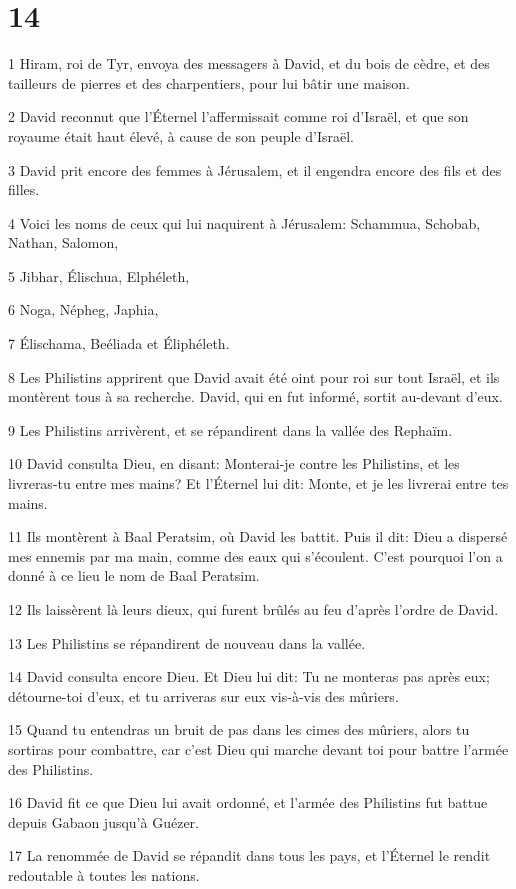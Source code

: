 \chapter{14}

\par 1 Hiram, roi de Tyr, envoya des messagers à David, et du bois de cèdre, et des tailleurs de pierres et des charpentiers, pour lui bâtir une maison.
\par 2 David reconnut que l'Éternel l'affermissait comme roi d'Israël, et que son royaume était haut élevé, à cause de son peuple d'Israël.
\par 3 David prit encore des femmes à Jérusalem, et il engendra encore des fils et des filles.
\par 4 Voici les noms de ceux qui lui naquirent à Jérusalem: Schammua, Schobab, Nathan, Salomon,
\par 5 Jibhar, Élischua, Elphéleth,
\par 6 Noga, Népheg, Japhia,
\par 7 Élischama, Beéliada et Éliphéleth.
\par 8 Les Philistins apprirent que David avait été oint pour roi sur tout Israël, et ils montèrent tous à sa recherche. David, qui en fut informé, sortit au-devant d'eux.
\par 9 Les Philistins arrivèrent, et se répandirent dans la vallée des Rephaïm.
\par 10 David consulta Dieu, en disant: Monterai-je contre les Philistins, et les livreras-tu entre mes mains? Et l'Éternel lui dit: Monte, et je les livrerai entre tes mains.
\par 11 Ils montèrent à Baal Peratsim, où David les battit. Puis il dit: Dieu a dispersé mes ennemis par ma main, comme des eaux qui s'écoulent. C'est pourquoi l'on a donné à ce lieu le nom de Baal Peratsim.
\par 12 Ils laissèrent là leurs dieux, qui furent brûlés au feu d'après l'ordre de David.
\par 13 Les Philistins se répandirent de nouveau dans la vallée.
\par 14 David consulta encore Dieu. Et Dieu lui dit: Tu ne monteras pas après eux; détourne-toi d'eux, et tu arriveras sur eux vis-à-vis des mûriers.
\par 15 Quand tu entendras un bruit de pas dans les cimes des mûriers, alors tu sortiras pour combattre, car c'est Dieu qui marche devant toi pour battre l'armée des Philistins.
\par 16 David fit ce que Dieu lui avait ordonné, et l'armée des Philistins fut battue depuis Gabaon jusqu'à Guézer.
\par 17 La renommée de David se répandit dans tous les pays, et l'Éternel le rendit redoutable à toutes les nations.

